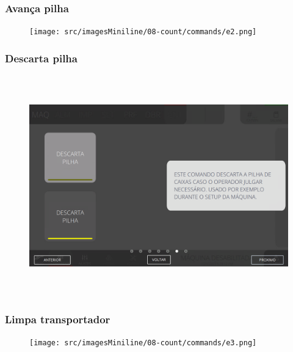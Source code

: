 \newpage
\thispagestyle{fancy}
\vspace*{40 pt}
\subsubsection{\small{Avança pilha}}\label{miniTelaComandoAvancaPilha}
\vspace*{\fill}
\begin{figure}[h]
  \centering
  \texttt{[image: src/imagesMiniline/08-count/commands/e2.png]}
\end{figure}
\vspace*{\fill}

\newpage
\thispagestyle{fancy}
\vspace*{40 pt}
\subsubsection{\small{Descarta pilha}}\label{miniTelaComandoContagemDescartaPilha}
\vspace*{\fill}
\begin{figure}[h]
  \centering
  \includegraphics[width=576px,height=360px]{src/imagesFlexo/08-count/commands/e-6.png}
\end{figure}
\vspace*{\fill}

\newpage
\thispagestyle{fancy}
\vspace*{40 pt}
\subsubsection{\small{Limpa transportador}}\label{miniTelaComandoContagemLimpaTransportador}
\vspace*{\fill}
\begin{figure}[h]
  \centering
  \texttt{[image: src/imagesMiniline/08-count/commands/e3.png]}
\end{figure}
\vspace*{\fill}

